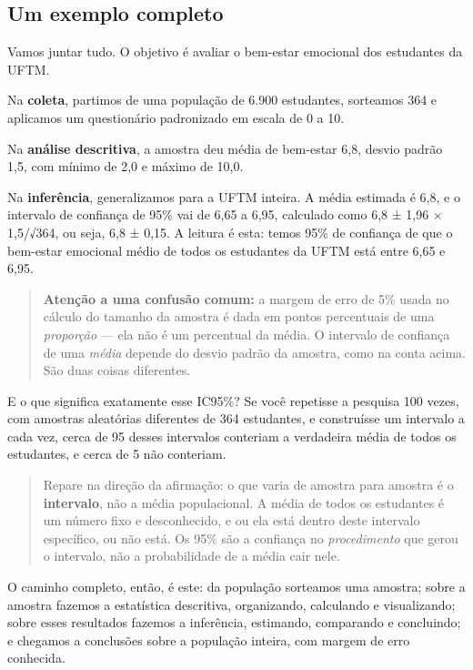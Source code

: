 \documentclass[
]{book}
\begin{document}
\subsection{Um exemplo completo}\label{um-exemplo-completo}

Vamos juntar tudo. O objetivo é avaliar o bem-estar emocional dos estudantes da UFTM.

Na \textbf{coleta}, partimos de uma população de 6.900 estudantes, sorteamos 364 e aplicamos um questionário padronizado em escala de 0 a 10.

Na \textbf{análise descritiva}, a amostra deu média de bem-estar 6,8, desvio padrão 1,5, com mínimo de 2,0 e máximo de 10,0.

Na \textbf{inferência}, generalizamos para a UFTM inteira. A média estimada é 6,8, e o intervalo de confiança de 95\% vai de 6,65 a 6,95, calculado como 6,8 ± 1,96 × 1,5/√364, ou seja, 6,8 ± 0,15. A leitura é esta: temos 95\% de confiança de que o bem-estar emocional médio de todos os estudantes da UFTM está entre 6,65 e 6,95.

\begin{quote}
\textbf{Atenção a uma confusão comum:} a margem de erro de 5\% usada no cálculo do tamanho da amostra é dada em pontos percentuais de uma \emph{proporção} --- ela não é um percentual da média. O intervalo de confiança de uma \emph{média} depende do desvio padrão da amostra, como na conta acima. São duas coisas diferentes.
\end{quote}

E o que significa exatamente esse IC95\%? Se você repetisse a pesquisa 100 vezes, com amostras aleatórias diferentes de 364 estudantes, e construísse um intervalo a cada vez, cerca de 95 desses intervalos conteriam a verdadeira média de todos os estudantes, e cerca de 5 não conteriam.

\begin{quote}
Repare na direção da afirmação: o que varia de amostra para amostra é o \textbf{intervalo}, não a média populacional. A média de todos os estudantes é um número fixo e desconhecido, e ou ela está dentro deste intervalo específico, ou não está. Os 95\% são a confiança no \emph{procedimento} que gerou o intervalo, não a probabilidade de a média cair nele.
\end{quote}

O caminho completo, então, é este: da população sorteamos uma amostra; sobre a amostra fazemos a estatística descritiva, organizando, calculando e visualizando; sobre esses resultados fazemos a inferência, estimando, comparando e concluindo; e chegamos a conclusões sobre a população inteira, com margem de erro conhecida.
\end{document}
